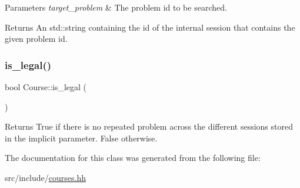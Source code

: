 \begin{DoxyParams}{Parameters}
{\em target\+\_\+problem} & The problem id to be searched. \\
\hline
\end{DoxyParams}
\begin{DoxyReturn}{Returns}
An std\+::string containing the id of the internal session that contains the given problem id. 
\end{DoxyReturn}
\mbox{\label{classCourse_a3e2bd434ae266de10601112d808f5e15}} 
\subsubsection{\texorpdfstring{is\+\_\+legal()}{is\_legal()}}
{\footnotesize\ttfamily bool Course\+::is\+\_\+legal (\begin{DoxyParamCaption}{ }\end{DoxyParamCaption})}

\begin{DoxyReturn}{Returns}
True if there is no repeated problem across the different sessions stored in the implicit parameter. False otherwise. 
\end{DoxyReturn}


The documentation for this class was generated from the following file\+:\begin{DoxyCompactItemize}
\item 
src/include/\hyperlink{courses_8hh}{courses.\+hh}\end{DoxyCompactItemize}
